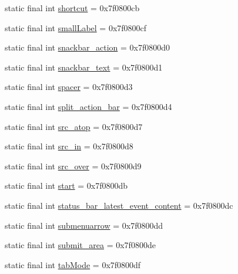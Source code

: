 \begin{DoxyCompactItemize}
static final int \mbox{\hyperlink{classandroid_1_1support_1_1design_1_1R_1_1id_a9e39fbfaefbdc10d69bb31d13bf4959c}{shortcut}} = 0x7f0800cb
\item 
static final int \mbox{\hyperlink{classandroid_1_1support_1_1design_1_1R_1_1id_ad269a4dcba96e834b17c3eb9e1900474}{small\+Label}} = 0x7f0800cf
\item 
static final int \mbox{\hyperlink{classandroid_1_1support_1_1design_1_1R_1_1id_a073bc2a75a5089a68ae23abebbdb13f6}{snackbar\+\_\+action}} = 0x7f0800d0
\item 
static final int \mbox{\hyperlink{classandroid_1_1support_1_1design_1_1R_1_1id_a1ac0d96909145afa11cdd3489a7adfb0}{snackbar\+\_\+text}} = 0x7f0800d1
\item 
static final int \mbox{\hyperlink{classandroid_1_1support_1_1design_1_1R_1_1id_a29506b5ea15ea1e16972548834bfc1d9}{spacer}} = 0x7f0800d3
\item 
static final int \mbox{\hyperlink{classandroid_1_1support_1_1design_1_1R_1_1id_a6a714dbfce5b2bd17ac6888b45bab492}{split\+\_\+action\+\_\+bar}} = 0x7f0800d4
\item 
static final int \mbox{\hyperlink{classandroid_1_1support_1_1design_1_1R_1_1id_a07a92f1e2e517cc2410d6b29d15e61dd}{src\+\_\+atop}} = 0x7f0800d7
\item 
static final int \mbox{\hyperlink{classandroid_1_1support_1_1design_1_1R_1_1id_a7561532289295b8b13fecd179ea90562}{src\+\_\+in}} = 0x7f0800d8
\item 
static final int \mbox{\hyperlink{classandroid_1_1support_1_1design_1_1R_1_1id_a736f123ee86e4183fcfb8bd3022ba9b8}{src\+\_\+over}} = 0x7f0800d9
\item 
static final int \mbox{\hyperlink{classandroid_1_1support_1_1design_1_1R_1_1id_a0d737859bafd47bd0319c24213bf40ba}{start}} = 0x7f0800db
\item 
static final int \mbox{\hyperlink{classandroid_1_1support_1_1design_1_1R_1_1id_a64ae3efa15896f2f8faa162f61413ed1}{status\+\_\+bar\+\_\+latest\+\_\+event\+\_\+content}} = 0x7f0800dc
\item 
static final int \mbox{\hyperlink{classandroid_1_1support_1_1design_1_1R_1_1id_a09a95220083150a53dbebd8a8b21e4e1}{submenuarrow}} = 0x7f0800dd
\item 
static final int \mbox{\hyperlink{classandroid_1_1support_1_1design_1_1R_1_1id_ab333d43c33d6df1b253b423f4c06b51b}{submit\+\_\+area}} = 0x7f0800de
\item 
static final int \mbox{\hyperlink{classandroid_1_1support_1_1design_1_1R_1_1id_a28f007351f00cb138e17395355f11f88}{tab\+Mode}} = 0x7f0800df

\end{DoxyCompactItemize}
